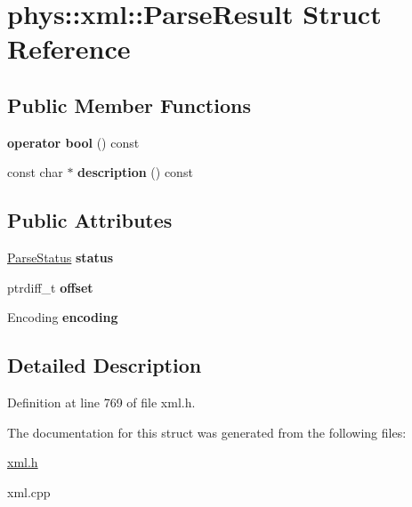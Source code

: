 \hypertarget{structphys_1_1xml_1_1ParseResult}{
\section{phys::xml::ParseResult Struct Reference}
\label{d5/dea/structphys_1_1xml_1_1ParseResult}
}
\subsection*{Public Member Functions}
\begin{DoxyCompactItemize}
\item 
\hypertarget{structphys_1_1xml_1_1ParseResult_a95c9989865c1bace7846995166a13e31}{
{\bfseries operator bool} () const }
\label{d5/dea/structphys_1_1xml_1_1ParseResult_a95c9989865c1bace7846995166a13e31}

\item 
\hypertarget{structphys_1_1xml_1_1ParseResult_a7bab3a3dc95653189b6d0952f2153aa5}{
const char $\ast$ {\bfseries description} () const }
\label{d5/dea/structphys_1_1xml_1_1ParseResult_a7bab3a3dc95653189b6d0952f2153aa5}

\end{DoxyCompactItemize}
\subsection*{Public Attributes}
\begin{DoxyCompactItemize}
\item 
\hypertarget{structphys_1_1xml_1_1ParseResult_afe00d4fd255ddc78d623e3648ef520e8}{
\hyperlink{namespacephys_1_1xml_ae7aabb879b21c73d8183a54470f8917f}{ParseStatus} {\bfseries status}}
\label{d5/dea/structphys_1_1xml_1_1ParseResult_afe00d4fd255ddc78d623e3648ef520e8}

\item 
\hypertarget{structphys_1_1xml_1_1ParseResult_afa03d9b88e7d2e181dcb25ed7890a85c}{
ptrdiff\_\-t {\bfseries offset}}
\label{d5/dea/structphys_1_1xml_1_1ParseResult_afa03d9b88e7d2e181dcb25ed7890a85c}

\item 
\hypertarget{structphys_1_1xml_1_1ParseResult_ade3b37d8061fe4aeb753887408766589}{
Encoding {\bfseries encoding}}
\label{d5/dea/structphys_1_1xml_1_1ParseResult_ade3b37d8061fe4aeb753887408766589}

\end{DoxyCompactItemize}


\subsection{Detailed Description}


Definition at line 769 of file xml.h.



The documentation for this struct was generated from the following files:\begin{DoxyCompactItemize}
\item 
\hyperlink{xml_8h}{xml.h}\item 
xml.cpp\end{DoxyCompactItemize}
